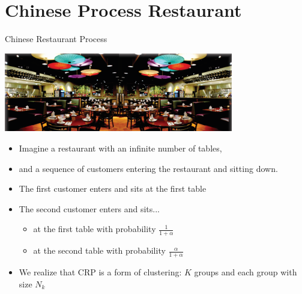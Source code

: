 \documentclass[handout]{beamer}
\begin{document}
\section{Chinese Process Restaurant}
\begin{frame}{Chinese Restaurant Process}
    {\centering
    \includegraphics[width=0.75\textwidth]{figures/crp.png}\par
    }
    \pause

    \begin{itemize}
        \item Imagine a restaurant with an infinite number of tables,
        \item and a sequence of customers entering the restaurant and sitting down.
        \item The first customer enters and sits at the first table
        \item The second customer enters and sits...
            \begin{itemize}
                \item at the first table with probability $\frac{1}{1 + \alpha}$
                \item at the second table with probability $\frac{\alpha}{1 + \alpha}$
            \end{itemize}
        \item We realize that CRP is a form of clustering: $K$ groups and each group with size $N_k$
    \end{itemize}
\end{frame}


\end{document}
